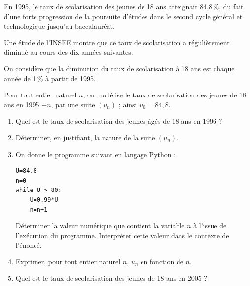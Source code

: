 \medskip

En 1995, le taux de scolarisation des jeunes de 18 ans atteignait 84,8\,\%, du fait d'une forte
progression de la poursuite d'études dans le second cycle général et technologique jusqu'au
baccalauréat.

Une étude de l'INSEE montre que ce taux de scolarisation a régulièrement diminué au cours
des dix années suivantes.

On considère que la diminution du taux de scolarisation à 18 ans est chaque année de 1\,\% à
partir de 1995.

Pour tout entier naturel $n$, on modélise le taux de scolarisation des jeunes de 18 ans en
1995 +$ n$, par une suite $\left(u_n\right)$ ; ainsi $u_0 = 84,8$.

\medskip

\begin{enumerate}
\item Quel est le taux de scolarisation des jeunes âgés de 18 ans en 1996 ?
\item Déterminer, en justifiant, la nature de la suite $\left(u_n\right)$.
\item On donne le programme suivant en langage Python :
\begin{lstlisting}[style=python]
U=84.8
n=0
while U > 80:
	U=0.99*U
	n=n+1
\end{lstlisting}

Déterminer la valeur numérique que contient la variable $n$ à l'issue de l'exécution du
programme. Interpréter cette valeur dans le contexte de l'énoncé.
\item Exprimer, pour tout entier naturel $n$, $u_n$ en fonction de $n$.
\item Quel est le taux de scolarisation des jeunes de 18 ans en 2005 ?
\end{enumerate}

\vspace{0,5cm}
